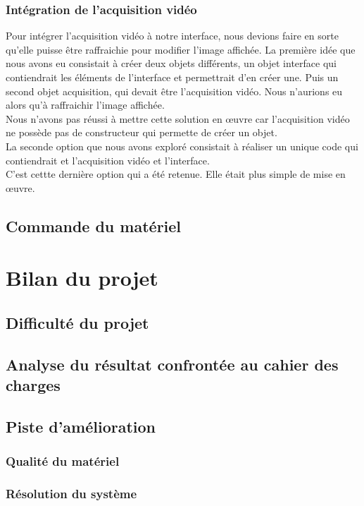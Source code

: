 \documentclass[a4paper]{report}
\begin{document}
            \subsection{Intégration de l'acquisition vidéo}
            Pour intégrer l'acquisition vidéo à notre interface, nous devions faire en sorte qu'elle puisse être raffraichie pour modifier l'image affichée. La première idée que nous avons eu consistait à créer deux objets différents, un objet interface qui contiendrait les éléments de l'interface et permettrait d'en créer une. Puis un second objet acquisition, qui devait être l'acquisition vidéo. Nous n'aurions eu alors qu'à raffraichir l'image affichée.\\
            Nous n'avons pas réussi à mettre cette solution en œuvre car l'acquisition vidéo ne possède pas de constructeur qui permette de créer un objet.\\
            La seconde option que nous avons exploré consistait à réaliser un unique code qui contiendrait et l'acquisition vidéo et l'interface.\\
            C'est cettte dernière option qui a été retenue. Elle était plus simple de mise en œuvre. 
        \section{Commande du matériel}

    \chapter{Bilan du projet}

        \section{Difficulté du projet}
        \section{Analyse du résultat confrontée au cahier des charges}
        \section{Piste d'amélioration}
            \subsection{Qualité du matériel}
            \subsection{Résolution du système}
            
\end{document}
